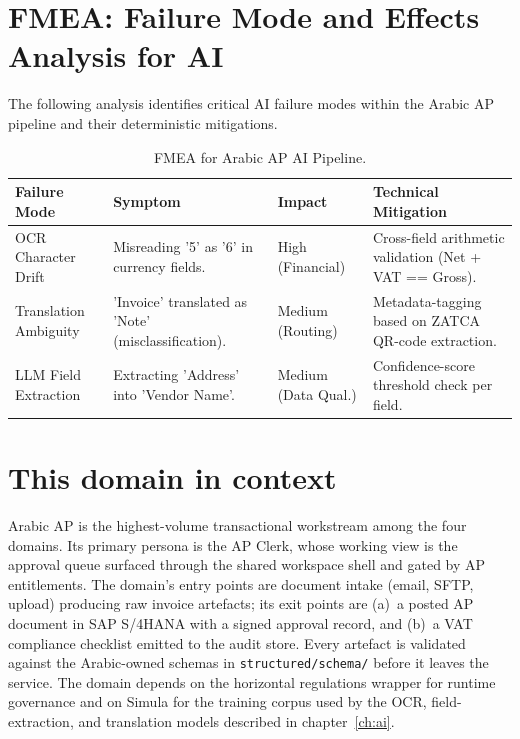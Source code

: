 \documentclass[11pt,a4paper,twoside]{report}
\begin{document}
\section{FMEA: Failure Mode and Effects Analysis for AI}
\label{sec:fmea-ai}

The following analysis identifies critical AI failure modes within the Arabic AP pipeline and their deterministic mitigations.

\begin{table}[htbp]
\centering
\footnotesize
\caption{FMEA for Arabic AP AI Pipeline.}
\label{tab:arabic-fmea}
\begin{tabularx}{\textwidth}{@{}l X X X@{}}
\toprule
\textbf{Failure Mode} & \textbf{Symptom} & \textbf{Impact} & \textbf{Technical Mitigation} \\
\midrule
OCR Character Drift & Misreading '5' as '6' in currency fields. & High (Financial) & Cross-field arithmetic validation (Net + VAT == Gross). \\
Translation Ambiguity & 'Invoice' translated as 'Note' (misclassification). & Medium (Routing) & Metadata-tagging based on ZATCA QR-code extraction. \\
LLM Field Extraction & Extracting 'Address' into 'Vendor Name'. & Medium (Data Qual.) & Confidence-score threshold check per field. \\
\bottomrule
\end{tabularx}
\end{table}

\section{This domain in context}
\label{sec:agent-domain-context}
Arabic AP is the highest-volume transactional workstream among the
four domains. Its primary persona is the AP Clerk, whose working view
is the approval queue surfaced through the shared workspace shell and
gated by AP entitlements. The domain's entry points are document
intake (email, SFTP, upload) producing raw invoice artefacts; its
exit points are (a)~a posted AP document in SAP S/4HANA with a signed
approval record, and (b)~a VAT compliance checklist emitted to the
audit store. Every artefact is validated against the Arabic-owned
schemas in \texttt{structured/schema/} before it leaves the service.
The domain depends on the horizontal regulations wrapper for runtime
governance and on Simula for the training corpus used by the OCR,
field-extraction, and translation models described in
chapter~\ref{ch:ai}.
\end{document}

